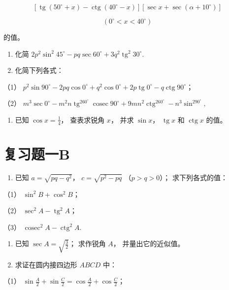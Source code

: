 \[
[ \operatorname{tg} (50 ^{\circ} + x) - \operatorname{ctg} (40 ^{\circ} - x) ] [ \sec x + \sec (\alpha + 10 ^{\circ}) ]
\]

\[
(0 ^{\circ} <   x <   40 ^{\circ})
\]

的值。

\begin{enumerate}[start=5]
\item
  化简
  \(2p^{2}\sin^{2}45^{\circ} - pq\sec 60^{\circ} + 3q^{2}\operatorname{tg}^{2}30^{\circ}\).
\item
  化简下列各式：
\end{enumerate}

（1）
\(p^2\sin 90^\circ - 2pq\cos 0^\circ + q^2\cos 0^\circ + 2p\operatorname{tg}0^\circ - q\operatorname{ctg}90^\circ\)；

（2）
\(m^3 \sec 0^\circ - m^2 n \operatorname{tg}^260^\circ \operatorname{cosec} 90^\circ + 9m n^2 \operatorname{ctg}^260^\circ - n^3 \sin^290^\circ,\)

\begin{enumerate}[start=7]
\item
  已知 \(\cos x = \frac{1}{4}\)， 查表求锐角 \(x\)， 并求 \(\sin x\)，
  \(\operatorname{tg} x\) 和 \(\operatorname{ctg} x\) 的值。
\end{enumerate}

\section{复习题一B}

\begin{enumerate}
\item
  已知 \(a = \sqrt{pq - q^2}\)， \(c = \sqrt{p^2 - pq}\)
  （\(p > q > 0\)）； 求下列各式的值：
\end{enumerate}

（1） \(\sin^2 B + \cos^2 B\)；

（2） \(\sec^2 A - \operatorname{tg}^2 A\)；

（3） \(\operatorname{cosec}^2 A - \operatorname{ctg}^2 A.\)

\begin{enumerate}[start=2]
\item
  已知 \(\sec A = \sqrt{\frac{3}{2}}\)； 求作锐角 \(A\)，
  并量出它的近似值。
\item
  求证在圆内接四边形 \(ABCD\) 中：
\end{enumerate}

（1）
\(\sin \frac{A}{2} + \sin \frac{C}{2} = \cos \frac{A}{2} + \cos \frac{C}{2}\)；

